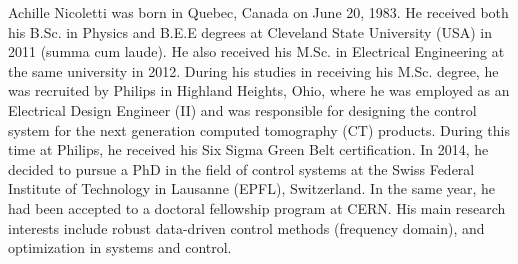 \documentclass[journal]{IEEEtran}
\begin{document}
{%

%


\iffalse
\vspace*{-2\baselineskip}

\begin{IEEEbiography}{Achille Nicoletti} was born in Quebec, Canada on June 20, 1983. He received both his B.Sc. in Physics and B.E.E degrees at Cleveland State University (USA) in 2011 (summa cum laude). He also received his M.Sc. in Electrical Engineering at the same university in 2012. During his studies in receiving his M.Sc. degree, he was recruited by Philips in Highland Heights, Ohio, where he was employed as an Electrical Design Engineer (II) and was responsible for designing the control system for the next generation computed tomography (CT) products. During this time at Philips, he received his Six Sigma Green Belt certification. In 2014, he decided to pursue a PhD in the field of control systems at the Swiss Federal Institute of Technology in Lausanne (EPFL), Switzerland. In the same year, he had been accepted to a doctoral fellowship program at CERN. His main research interests include robust data-driven control methods (frequency domain), and optimization in systems and control.
\end{IEEEbiography}

\vspace*{-2\baselineskip}

}
\end{document}
